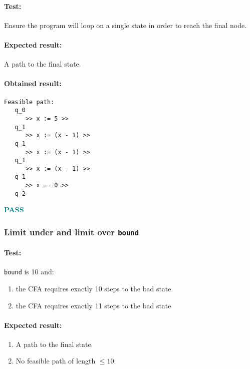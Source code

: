 \documentclass[letterpaper,12pt]{article}
\begin{document}
\paragraph{Test:}
Ensure the program will loop on a single state in order to reach the final node.
\paragraph{Expected result:}
A path to the final state.
\paragraph{Obtained result:}
\begin{verbatim}
Feasible path:
   q_0
      >> x := 5 >>
   q_1
      >> x := (x - 1) >>
   q_1
      >> x := (x - 1) >>
   q_1
      >> x := (x - 1) >>
   q_1
      >> x == 0 >>
   q_2

\end{verbatim}
\textbf{\textcolor{teal}{PASS}}


\subsubsection{Limit under and limit over \texttt{bound}}
\paragraph{Test:}
\texttt{bound} is 10 and:
\begin{enumerate}
\item the CFA requires exactly 10 steps to the bad state.
\item the CFA requires exactly 11 steps to the bad state
\end{enumerate}
\paragraph{Expected result:}
\begin{enumerate}
\item A path to the final state.
\item No feasible path of length $\leq 10$.
\end{enumerate}
\end{document}
